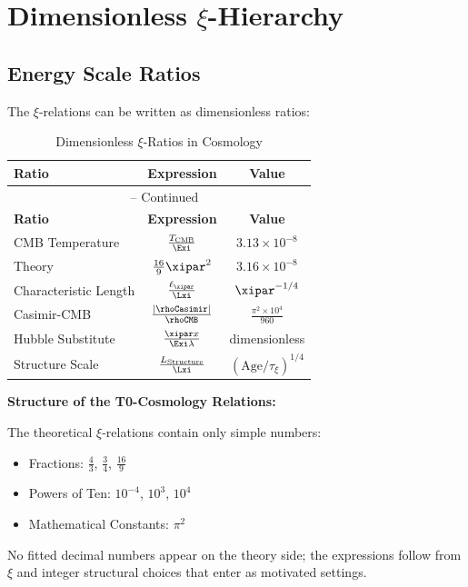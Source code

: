 	\section{Dimensionless $\xi$-Hierarchy}
	
	\subsection{Energy Scale Ratios}
	
	The $\xi$-relations can be written as dimensionless ratios:
	
	\begin{longtable}{lcc}
		\caption{Dimensionless $\xi$-Ratios in Cosmology} \\
		\toprule
		\textbf{Ratio} & \textbf{Expression} & \textbf{Value} \\
		\midrule
		\endfirsthead
		\multicolumn{3}{c}{\tablename\ \thetable{} -- Continued} \\
		\toprule
		\textbf{Ratio} & \textbf{Expression} & \textbf{Value} \\
		\midrule
		\endhead
		CMB Temperature & $\frac{T_{\text{CMB}}}{\Exi}$ & $3.13 \times 10^{-8}$ \\
		Theory & $\frac{16}{9}\xipar^2$ & $3.16 \times 10^{-8}$ \\
		Characteristic Length & $\frac{\ell_{\xipar}}{\Lxi}$ & $\xipar^{-1/4}$ \\
		Casimir-CMB & $\frac{|\rhoCasimir|}{\rhoCMB}$ & $\frac{\pi^2 \times 10^4}{960}$ \\
		Hubble Substitute & $\frac{\xipar x}{\Exi \lambda}$ & dimensionless \\
		Structure Scale & $\frac{L_{\text{Structure}}}{\Lxi}$ & $(\text{Age}/\tau_\xi)^{1/4}$ \\
		\bottomrule
	\end{longtable}
\normalsize
	
	\begin{warning}
		\textbf{Structure of the T0-Cosmology Relations:}
		
		The theoretical $\xi$-relations contain only simple numbers:
		\begin{itemize}
			\item Fractions: $\frac{4}{3}$, $\frac{3}{4}$, $\frac{16}{9}$
			\item Powers of Ten: $10^{-4}$, $10^3$, $10^4$
			\item Mathematical Constants: $\pi^2$
		\end{itemize}
		
		No fitted decimal numbers appear on the theory side; the expressions follow from $\xi$ and integer structural choices that enter as motivated settings.
	\end{warning}
	
